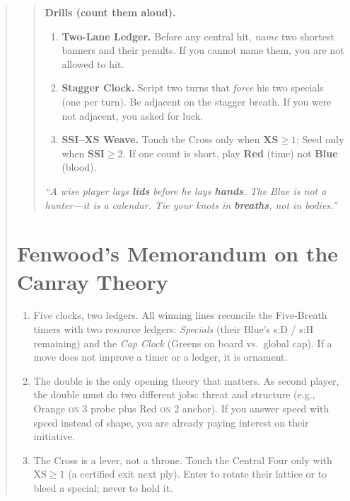 \documentclass[11pt]{article}
\begin{document}
\begin{quote}
\begin{quote}
\medskip
\textbf{Drills (count them aloud).}
\begin{enumerate}\itemsep0.25em
  \item \textbf{Two-Lane Ledger.} Before any central hit, \emph{name} two shortest banners and their penults. If you cannot name them, you are not allowed to hit.
  \item \textbf{Stagger Clock.} Script two turns that \emph{force} his two specials (one per turn). Be adjacent on the stagger breath. If you were not adjacent, you asked for luck.
  \item \textbf{SSI–XS Weave.} Touch the Cross only when \(\textbf{XS}\ge1\); Seed only when \(\textbf{SSI}\ge2\). If one count is short, play \textbf{Red} (time) not \textbf{Blue} (blood).
\end{enumerate}

\medskip
\emph{“A wise player lays \textbf{lids} before he lays \textbf{hands}. The Blue is not a hunter—it is a calendar. Tie your knots in \textbf{breaths}, not in bodies.”}
\end{quote}
\clearpage
\section{Fenwood’s Memorandum on the Canray Theory}
\label{sec:fenwood-memo}

\begin{tcolorbox}[enhanced,breakable,
  colback=royal!3, colframe=royal!70!black, boxrule=0.6pt,
  title={Fenwood’s Memorandum on the Canray Theory}]
\begin{enumerate}[leftmargin=*,itemsep=0.5em,label=\textbf{Thesis \Roman*.}]

\item Five clocks, two ledgers. All winning lines reconcile the Five-Breath timers with two resource ledgers: \emph{Specials} (their Blue’s s{:}D / s{:}H remaining) and the \emph{Cap Clock} (Greens on board vs.\ global cap). If a move does not improve a timer or a ledger, it is ornament.

\item The double is the only opening theory that matters. As second player, the double must do two different jobs: threat and structure (e.g., Orange \textsc{on} 3 probe plus Red \textsc{on} 2 anchor). If you answer speed with speed instead of shape, you are already paying interest on their initiative.

\item The Cross is a lever, not a throne. Touch the Central Four only with $\mathrm{XS}\ge 1$ (a certified exit next ply). Enter to rotate their lattice or to bleed a special; never to hold it.


\end{enumerate}
\end{tcolorbox}
\end{quote}
\end{document}
